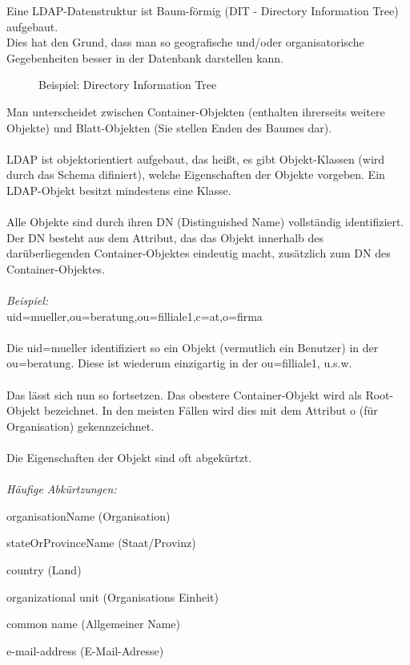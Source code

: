 Eine LDAP-Datenstruktur ist Baum-förmig (DIT - Directory Information Tree) aufgebaut.\\
Dies hat den Grund, dass man so geografische und/oder organisatorische Gegebenheiten besser in der Datenbank darstellen kann.
\\
\begin{figure}[H]
\centering
{}
\caption{Beispiel: Directory Information Tree}
\label{fig:content_ldap_dit}
\end{figure}
Man unterscheidet zwischen Container-Objekten (enthalten ihrerseits weitere Objekte) und Blatt-Objekten (Sie stellen Enden des Baumes dar).\\
\\
LDAP ist objektorientiert aufgebaut, das heißt, es gibt Objekt-Klassen (wird durch das Schema difiniert), welche Eigenschaften der Objekte vorgeben. Ein LDAP-Objekt besitzt mindestens eine Klasse.\\
\\
Alle Objekte sind durch ihren DN (Distinguished Name) vollständig identifiziert. 
Der DN besteht aus dem Attribut, das das Objekt innerhalb des darüberliegenden Container-Objektes eindeutig macht, zusätzlich zum DN des Container-Objektes.\\
\\
\textit{Beispiel: }\\
uid=mueller,ou=beratung,ou=filliale1,c=at,o=firma\\
\\
Die uid=mueller identifiziert so ein Objekt (vermutlich ein Benutzer) in der ou=beratung. Diese ist wiederum einzigartig in der ou=filliale1, u.s.w.\\
\\
Das lässt sich nun so fortsetzen. Das obestere Container-Objekt wird als Root-Objekt bezeichnet. In den meisten Fällen wird dies mit dem Attribut o (für Organisation) gekennzeichnet.\\
\\
Die Eigenschaften der Objekt sind oft abgekürtzt.\\
\\
\textit{Häufige Abkürtzungen:}\\
\begin{description}[style=nextline]
	\item[o]
		organisationName (Organisation)
	\item[st]
		stateOrProvinceName (Staat/Provinz)
	\item[c]
		country (Land)
	\item[ou]
		organizational unit (Organisations Einheit)
	\item[cn]
		common name (Allgemeiner Name)
	\item[mail]
		e-mail-address (E-Mail-Adresse)
\end{description}

